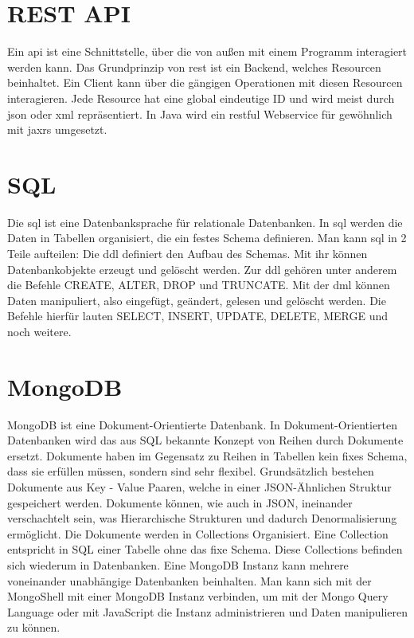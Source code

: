 \section{REST API}
\label{sec:rest}

Ein \ac{api} ist eine Schnittstelle, über die von außen mit einem Programm interagiert werden kann.
Das Grundprinzip von \ac{rest} ist ein Backend, welches Resourcen beinhaltet.
Ein Client kann über die gängigen  Operationen mit diesen Resourcen interagieren.
Jede Resource hat eine global eindeutige ID und wird meist durch \ac{json} oder \ac{xml} repräsentiert.
In Java wird ein \ac{rest}ful Webservice für gewöhnlich mit \ac{jaxrs} umgesetzt.
~\autocite{schiesser:javaEE7}

\section{SQL}
\label{sec:sql}

Die \ac{sql} ist eine Datenbanksprache für relationale Datenbanken.
In \ac{sql} werden die Daten in Tabellen organisiert, die ein festes Schema definieren.
Man kann \ac{sql} in 2 Teile aufteilen:
Die \ac{ddl} definiert den Aufbau des Schemas.
Mit ihr können Datenbankobjekte erzeugt und gelöscht werden.
Zur \ac{ddl} gehören unter anderem die Befehle CREATE, ALTER, DROP und TRUNCATE\@.
Mit der \ac{dml} können Daten manipuliert, also eingefügt, geändert, gelesen und gelöscht werden.
Die Befehle hierfür lauten SELECT, INSERT, UPDATE, DELETE, MERGE und noch weitere.
~\autocite{schicker:datenbanken}

\section{MongoDB}
\label{sec:mongodb}

MongoDB ist eine Dokument-Orientierte Datenbank. 
In Dokument-Orientierten Datenbanken wird das aus SQL bekannte Konzept von Reihen durch Dokumente ersetzt.
Dokumente haben im Gegensatz zu Reihen in Tabellen kein fixes Schema, dass sie erfüllen müssen, sondern sind sehr flexibel.
Grundsätzlich bestehen Dokumente aus Key - Value Paaren, welche in einer JSON-Ähnlichen Struktur gespeichert werden.
Dokumente können, wie auch in JSON, ineinander verschachtelt sein, was Hierarchische Strukturen und dadurch Denormalisierung ermöglicht.
Die Dokumente werden in Collections Organisiert.
Eine Collection entspricht in SQL einer Tabelle ohne das fixe Schema.
Diese Collections befinden sich wiederum in Datenbanken.
Eine MongoDB Instanz kann mehrere voneinander unabhängige Datenbanken beinhalten.
Man kann sich mit der MongoShell mit einer MongoDB Instanz verbinden, um mit der Mongo Query Language oder mit JavaScript die Instanz administrieren und Daten manipulieren zu können.
~\autocite{bradshaw:mongodb}

